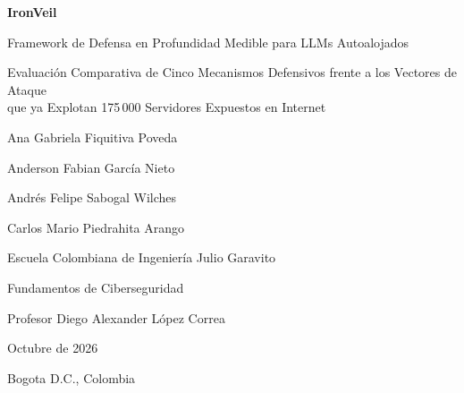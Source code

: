 \documentclass[11pt,letterpaper]{article}
\begin{document}
\begin{titlepage}
\thispagestyle{empty}
\begin{center}

\vspace*{3.5cm}

{\Large\bfseries
IronVeil\par
\vspace{4pt}
{\large\normalfont Framework de Defensa en Profundidad Medible para LLMs Autoalojados\par}
\vspace{6pt}
\large\normalfont Evaluación Comparativa de Cinco Mecanismos Defensivos frente a los Vectores de Ataque\\
que ya Explotan 175\,000 Servidores Expuestos en Internet
\par}

\vspace{3.2cm}

{\large
Ana Gabriela Fiquitiva Poveda\par
Anderson Fabian García Nieto\par
Andrés Felipe Sabogal Wilches\par
Carlos Mario Piedrahita Arango
\par}

\vspace{3.2cm}

{\large
Escuela Colombiana de Ingeniería Julio Garavito\par
Fundamentos de Ciberseguridad\par
Profesor Diego Alexander López Correa\par
Octubre de 2026
\par
Bogota D.C., Colombia
\par}

\end{center}
\vspace*{\fill}
\end{titlepage}

\clearpage
{}
\end{document}
